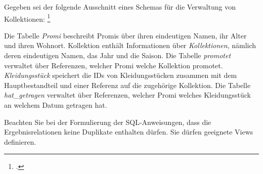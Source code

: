 \documentclass{bschlangaul-aufgabe}
\begin{document}

Gegeben sei der folgende Ausschnitt eines Schemas für die Verwaltung von
Kollektionen:
\footcite{examen:66116:2020:03}








Die Tabelle \emph{Promi} beschreibt Promis über ihren eindeutigen Namen,
ihr Alter und ihren Wohnort. Kollektion enthält Informationen über
\emph{Kollektionen}, nämlich deren eindeutigen Namen, das Jahr und die
Saison. Die Tabelle \emph{promotet} verwaltet über Referenzen, welcher
Promi welche Kollektion promotet. \emph{Kleidungsstück} speichert die
IDs von Kleidungsstücken zusammen mit dem Hauptbestandteil und einer
Referenz auf die zugehörige Kollektion. Die Tabelle \emph{hat\_getragen}
verwaltet über Referenzen, welcher Promi welches Kleidungsstück an
welchem Datum getragen hat.

\bigskip

Beachten Sie bei der Formulierung der SQL-Anweisungen, dass die
Ergebnisrelationen keine Duplikate enthalten dürfen. Sie dürfen
geeignete Views definieren.
\end{document}
